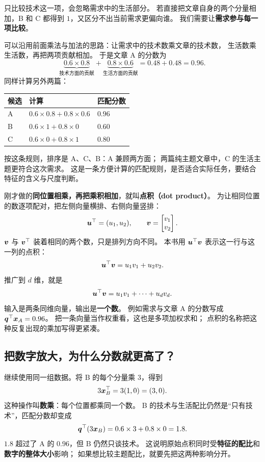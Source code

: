 只比较技术这一项，会忽略需求中的生活部分。
若直接把文章自身的两个分量相加，B 和 C 都得到 $1$，又区分不出当前需求更偏向谁。
我们需要让\textbf{需求参与每一项比较}。

可以沿用前面乘法与加法的思路：让需求中的技术数乘文章的技术数，
生活数乘生活数，再把两项贡献相加。
于是文章 A 的分数为
\[
\underbrace{0.6\times0.8}_{\text{技术方面的贡献}}
+\underbrace{0.8\times0.6}_{\text{生活方面的贡献}}
=0.48+0.48=0.96.
\]
同样计算另外两篇：
\begin{center}
\begin{tabular}{@{}lll@{}}\toprule
候选 & 计算 & 匹配分数\\\midrule
A & $0.6\times0.8+0.8\times0.6$ & $0.96$\\
B & $0.6\times1+0.8\times0$ & $0.60$\\
C & $0.6\times0+0.8\times1$ & $0.80$\\\bottomrule
\end{tabular}
\end{center}
按这条规则，排序是 A、C、B：A 兼顾两方面；
两篇纯主题文章中，C 的生活主题更符合这次需求。
这是一条方便计算的匹配规则，是否适合实际任务，要结合特征的含义与尺度判断。

\label{concept:dot-product}
刚才做的\textbf{同位置相乘，再把乘积相加}，就叫\textbf{点积（dot product）}。
为让相同位置的数逐项配对，把左侧向量横排、右侧向量竖排：
\[
\boldsymbol{u}^\top=(u_1,u_2),\qquad
\boldsymbol{v}=\begin{bmatrix}v_1\\v_2\end{bmatrix}.
\]
$\boldsymbol{v}$ 与 $\boldsymbol{v}^\top$ 装着相同的两个数，只是排列方向不同。
本书用 $\boldsymbol{u}^\top\boldsymbol{v}$ 表示这一行与这一列的点积：
\begin{equation}
\boldsymbol{u}^\top\boldsymbol{v}=u_1v_1+u_2v_2.
\end{equation}
推广到 $d$ 维，就是
\[
\boldsymbol{u}^\top\boldsymbol{v}=u_1v_1+\cdots+u_dv_d.
\]
输入是两条同维向量，输出是\textbf{一个数}。
例如需求与文章 A 的分数写成 $\boldsymbol{q}^\top\boldsymbol{x}_A=0.96$。
把一条向量当作权重看，这也是多项加权求和；
点积的名称把这种反复出现的乘加写得更紧凑。

\subsection{把数字放大，为什么分数就更高了？}

继续使用同一组数据。将 B 的每个分量乘 $3$，得到
\[
3\boldsymbol{x}_B^\top=3(1,0)=(3,0).
\]
这种操作叫\textbf{数乘}：每个位置都乘同一个数。
B 的技术与生活配比仍然是“只有技术”，匹配分数却变成
\[
\boldsymbol{q}^\top(3\boldsymbol{x}_B)=0.6\times3+0.8\times0=1.8.
\]
$1.8$ 超过了 A 的 $0.96$，但 B 仍然只谈技术。
这说明原始点积同时受\textbf{特征的配比}和\textbf{数字的整体大小}影响；
如果想比较主题配比，就要先把这两种影响分开。

